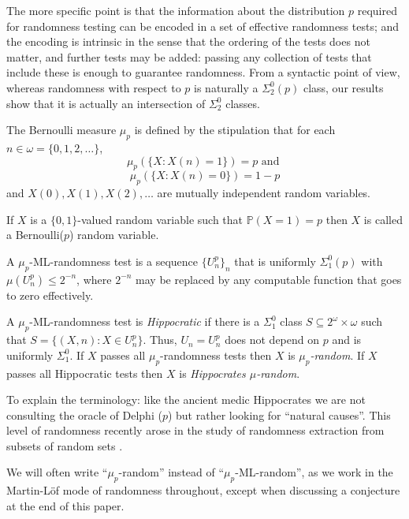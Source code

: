 The more specific point is that the information about the distribution $p$ required for randomness testing can be encoded in a set of effective randomness tests; and the encoding is intrinsic in the sense that the ordering of the tests does not matter, and further tests may be added: passing any collection of tests that include these is enough to guarantee randomness. From a syntactic point of view, whereas randomness with respect to $p$ is naturally a $\Sigma^0_2(p)$ class, our results show that it is actually an intersection of $\Sigma^0_{2}$ classes.

\begin{definition}\label{bernoulli}
The Bernoulli measure $\mu_{p}$ is defined by the stipulation that for each $n\in\omega=\{0,1,2,\ldots\}$, 
\[
\mu_p(\{X: X(n)=1\})=p \text{ and }
\]
\[
\mu_p(\{X:X(n)=0\})=1-p
\]
and $X(0),X(1),X(2),\ldots$ are mutually independent random variables.
\end{definition}
If $X$ is a $\{0,1\}$-valued random variable such that $\mathbb P(X=1) = p$ then $X$ is called a Bernoulli($p$) random variable.
		

\begin{definition}\label{MLR}
	A $\mu_p$-ML-randomness test is a sequence $\{U^p_n\}_n$ that is uniformly $\Sigma^0_1(p)$ with $\mu(U^p_n)\le 2^{-n}$, where $2^{-n}$ may be replaced by any computable function that goes to zero effectively. 
	 
	A $\mu_p$-ML-randomness test is \emph{Hippocratic} if there is a $\Sigma^0_1$ class $S\subseteq 2^\omega\times\omega$ such that $S=\{(X,n):X\in U_n^p\}$. Thus, $U_n=U_n^p$ does not depend on $p$ and is uniformly $\Sigma^0_1$.  
If $X$ passes all $\mu_p$-randomness tests then $X$ is \emph{$\mu_p$-random}. If $X$ passes all Hippocratic tests then $X$ is \emph{Hippocrates $\mu$-random}.
\end{definition}

To explain the terminology: like the ancient medic Hippocrates we are not consulting the oracle of Delphi ($p$) but rather looking for ``natural causes''. This level of randomness recently arose in the study of randomness extraction from subsets of random sets \cite{MRL}.

We will often write ``$\mu_p$-random'' instead of ``$\mu_p$-ML-random'', as we work in the Martin-L\"of mode of randomness throughout, except when discussing a conjecture at the end of this paper.



